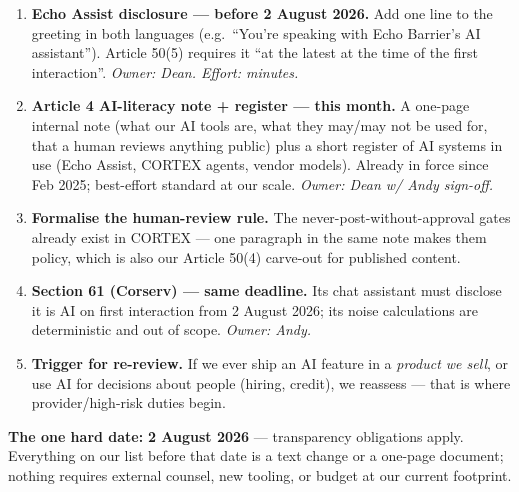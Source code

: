\documentclass[11pt]{article}
\newcommand{\actbox}[2]{\par\vspace{4pt}\noindent\colorbox{eborangetint}{\parbox{\dimexpr\linewidth-2\fboxsep}%
  {\vspace{3pt}\hspace{2pt}\textbf{\color{eborange}#1} #2\hspace{2pt}\vspace{3pt}}}\par\vspace{4pt}}
\begin{document}
\begin{enumerate}[leftmargin=1.8em,itemsep=5pt]
  \item \textbf{Echo Assist disclosure --- before 2 August 2026.} Add one line to
    the greeting in both languages (e.g.\ ``You're speaking with Echo Barrier's
    AI assistant''). Article 50(5) requires it ``at the latest at the time of the
    first interaction''. \emph{Owner: Dean. Effort: minutes.}
  \item \textbf{Article 4 AI-literacy note + register --- this month.} A one-page
    internal note (what our AI tools are, what they may/may not be used for, that
    a human reviews anything public) plus a short register of AI systems in use
    (Echo Assist, CORTEX agents, vendor models). Already in force since Feb 2025;
    best-effort standard at our scale. \emph{Owner: Dean w/ Andy sign-off.}
  \item \textbf{Formalise the human-review rule.} The never-post-without-approval
    gates already exist in CORTEX --- one paragraph in the same note makes them
    policy, which is also our Article 50(4) carve-out for published content.
  \item \textbf{Section 61 (Corserv) --- same deadline.} Its chat assistant must
    disclose it is AI on first interaction from 2 August 2026; its noise
    calculations are deterministic and out of scope. \emph{Owner: Andy.}
  \item \textbf{Trigger for re-review.} If we ever ship an AI feature in a
    \emph{product we sell}, or use AI for decisions about people (hiring,
    credit), we reassess --- that is where provider/high-risk duties begin.
\end{enumerate}

\actbox{The one hard date:}{\textbf{2 August 2026} --- transparency obligations
apply. Everything on our list before that date is a text change or a one-page
document; nothing requires external counsel, new tooling, or budget at our
current footprint.}

\vspace{0.3cm}
\noindent{\color{ebgreen}\rule{\linewidth}{1pt}}\\[0.15cm]
\end{document}
